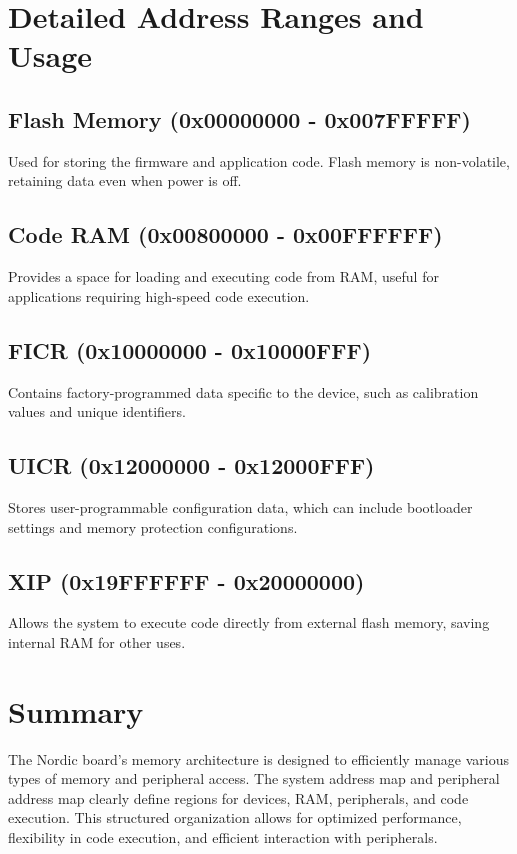 \documentclass{Configuration_Files/PoliMi3i_thesis}
\begin{document}
\section{Detailed Address Ranges and Usage}

\subsection{Flash Memory (0x00000000 - 0x007FFFFF)}
Used for storing the firmware and application code. Flash memory is non-volatile, retaining data even when power is off.

\subsection{Code RAM (0x00800000 - 0x00FFFFFF)}
Provides a space for loading and executing code from RAM, useful for applications requiring high-speed code execution.

\subsection{FICR (0x10000000 - 0x10000FFF)}
Contains factory-programmed data specific to the device, such as calibration values and unique identifiers.

\subsection{UICR (0x12000000 - 0x12000FFF)}
Stores user-programmable configuration data, which can include bootloader settings and memory protection configurations.

\subsection{XIP (0x19FFFFFF - 0x20000000)}
Allows the system to execute code directly from external flash memory, saving internal RAM for other uses.

\section{Summary}
The Nordic board's memory architecture is designed to efficiently manage various types of memory and peripheral access. The system address map and peripheral address map clearly define regions for devices, RAM, peripherals, and code execution. This structured organization allows for optimized performance, flexibility in code execution, and efficient interaction with peripherals.
\end{document}
